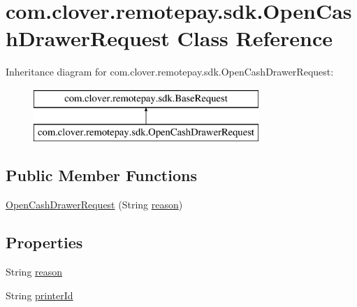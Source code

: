 \hypertarget{classcom_1_1clover_1_1remotepay_1_1sdk_1_1_open_cash_drawer_request}{}\section{com.\+clover.\+remotepay.\+sdk.\+Open\+Cash\+Drawer\+Request Class Reference}
\label{classcom_1_1clover_1_1remotepay_1_1sdk_1_1_open_cash_drawer_request}
Inheritance diagram for com.\+clover.\+remotepay.\+sdk.\+Open\+Cash\+Drawer\+Request\+:\begin{figure}[H]
\begin{center}
\leavevmode
\includegraphics[height=2.000000cm]{classcom_1_1clover_1_1remotepay_1_1sdk_1_1_open_cash_drawer_request}
\end{center}
\end{figure}
\subsection*{Public Member Functions}
\begin{DoxyCompactItemize}
\item 
\hyperlink{classcom_1_1clover_1_1remotepay_1_1sdk_1_1_open_cash_drawer_request_a9d8de60bf3fdf3f0ab0349e4da2e1efa}{Open\+Cash\+Drawer\+Request} (String \hyperlink{classcom_1_1clover_1_1remotepay_1_1sdk_1_1_open_cash_drawer_request_aee61c46c40bad1bdbcc28bfcb6aa264a}{reason})
\end{DoxyCompactItemize}
\subsection*{Properties}
\begin{DoxyCompactItemize}
\item 
String \hyperlink{classcom_1_1clover_1_1remotepay_1_1sdk_1_1_open_cash_drawer_request_aee61c46c40bad1bdbcc28bfcb6aa264a}{reason}
\item 
String \hyperlink{classcom_1_1clover_1_1remotepay_1_1sdk_1_1_open_cash_drawer_request_ae35b50aa0d14b15ae580acea8d0c8f07}{printer\+Id}
\end{DoxyCompactItemize}
